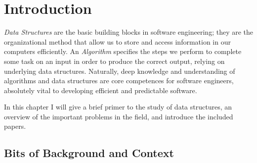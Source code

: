 \chapter{Introduction}
\emph{Data Structures} are the basic building blocks in software engineering; they are the organizational method that allow us to store and access information in our computers efficiently. 
An \emph{Algorithm} specifies the steps we perform to complete some task on an input in order to produce the correct output, relying on underlying data structures. %
Naturally, deep knowledge and understanding of algorithms and data structures are core competences for software engineers, absolutely vital to developing efficient and predictable software.


In this chapter I will give a brief primer to the study of data structures, an overview of the important problems in the field, and introduce the included papers.

\section{Bits of Background and Context}

